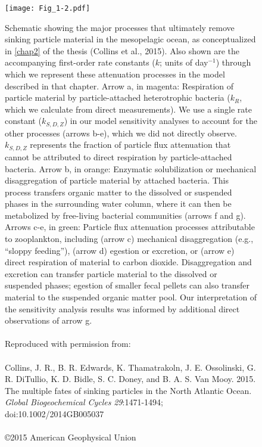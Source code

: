 \begin{figure}[!p]
\centering
\texttt{[image: Fig\_1-2.pdf]}
\caption[Schematic showing the major processes that ultimately remove sinking particle material in the mesopelagic ocean, as conceptualized in \autoref{chap2} of the thesis.]{Schematic showing the major processes that ultimately remove sinking particle material in the mesopelagic ocean, as conceptualized in \autoref{chap2} of the thesis (Collins et al., 2015). Also shown are the accompanying first-order rate constants ($k$; units of day$^{-1}$) through which we represent these attenuation processes in the model described in that chapter. Arrow a, in magenta: Respiration of particle material by particle-attached heterotrophic bacteria ($k_{R}$, which we calculate from direct measurements). We use a single rate constant ($k_{S,D,Z}$) in our model sensitivity analyses to account for the other processes (arrows b-e), which we did not directly observe. $k_{S,D,Z}$ represents the fraction of particle flux attenuation that cannot be attributed to direct respiration by particle-attached bacteria. Arrow b, in orange: Enzymatic solubilization or mechanical disaggregation of particle material by attached bacteria. This process transfers organic matter to the dissolved or suspended phases in the surrounding water column, where it can then be metabolized by free-living bacterial communities (arrows f and g). Arrows c-e, in green: Particle flux attenuation processes attributable to zooplankton, including (arrow c) mechanical disaggregation (e.g., ``sloppy feeding''), (arrow d) egestion or excretion, or (arrow e) direct respiration of material to carbon dioxide. Disaggregation and excretion can transfer particle material to the dissolved or suspended phases; egestion of smaller fecal pellets can also transfer material to the suspended organic matter pool. Our interpretation of the sensitivity analysis results was informed by additional direct observations of arrow g.\\\\\tiny{Reproduced with permission from:\\\\Collins, J. R., B. R. Edwards, K. Thamatrakoln, J. E. Ossolinski, G. R. DiTullio, K. D. Bidle, S. C. Doney, and B. A. S. Van Mooy. 2015. The multiple fates of sinking particles in the North Atlantic Ocean. \emph{Global Biogeochemical Cycles} \emph{29}:1471-1494; doi:10.1002/2014GB005037\\\\\copyright 2015 American Geophysical Union}}
\label{fig:c1n2}
\end{figure}

